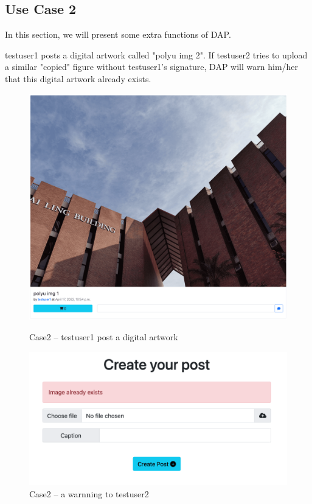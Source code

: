 \vspace{-1cm}

\subsection{Use Case 2}

In this section, we will present some extra functions of DAP.

testuser1 posts a digital artwork called "polyu img 2". If testuser2 tries to upload a similar "copied" figure without testuser1's signature, DAP will warn him/her that this digital artwork already exists.

\begin{figure}[!h]
    \centering
    \begin{minipage}{.45\textwidth}
        \centering
        \includegraphics[width=\linewidth]{figures/case2-1.png}
        \caption{Case2 -- testuser1 post a digital artwork}
        \label{fig: case2-1}
    \end{minipage}%
    \begin{minipage}{0.45\textwidth}
        \centering
        \includegraphics[width=\linewidth]{figures/case2-2.png}
        \caption{Case2 -- a warnning to testuser2}
        \label{fig: case2-1}
    \end{minipage}
\end{figure}

